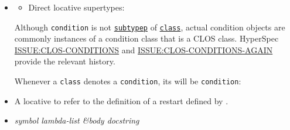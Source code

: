 \begin{itemize}
\item
  \label{x-28CONDITION-20MGL-PAX-3ALOCATIVE-29}

  \begin{itemize}
  \tightlist
  \item
    Direct locative supertypes:
  \end{itemize}

  Although \texttt{condition} is not
  \href{http://www.lispworks.com/documentation/HyperSpec/Body/f_subtpp.htm}{\texttt{subtypep}}
  of
  \href{http://www.lispworks.com/documentation/HyperSpec/Body/t_class.htm}{\texttt{class}},
  actual condition objects are commonly instances of a condition class
  that is a CLOS class. HyperSpec
  \href{http://www.lispworks.com/documentation/HyperSpec/Issues/iss049_w.htm}{ISSUE:CLOS-CONDITIONS}
  and
  \href{http://www.lispworks.com/documentation/HyperSpec/Issues/iss048_w.htm}{ISSUE:CLOS-CONDITIONS-AGAIN}
  provide the relevant history.

  Whenever a \texttt{class} denotes a \texttt{condition}, its
  will be \texttt{condition}:

\begin{Shaded}
\begin{Highlighting}[]
 \NormalTok{)}
\end{Highlighting}
\end{Shaded}
\item
  \label{x-28RESTART-20MGL-PAX-3ALOCATIVE-29}

  A locative to refer to the definition of a restart defined by
  .
\item
  \label{x-28DREF-3ADEFINE-RESTART-20MGL-PAX-3AMACRO-29}
  \emph{symbol lambda-list \&body docstring}


\end{itemize}
